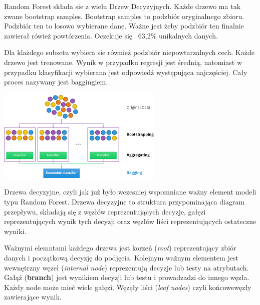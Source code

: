 \documentclass{article}
\begin{document}
Random Forest składa sie z wielu Drzew Decyzyjnych. Każde drzewo ma tak zwane bootstrap samples. Bootstrap samples to podzbiór oryginalnego zbioru. Podzbiór ten to losowo wybierane dane.
Ważne jest żeby podzbiór ten finalnie zawierał rówież powtórzenia. Oczekuje się ~63,2\% unikalnych danych. 

Dla klażdego subsetu wybiera sie również podzbiór niepowtarzalnych cech. Każde drzewo jest trenowane. Wynik w przypadku regresji jest średnią, natomiast w przypadku klasyfikacji wybierana jest odpowiedź występująca najczęściej. Cały proces nazywany jest baggingiem. 

 \begin{center}
    \includegraphics[scale=1]{images/bagging.png}
    \captionsetup{hypcap=false}
    \label{fig:bagging}
\end{center}

Drzewa decyzyjne, czyli jak już było wczesniej wspomniane ważny element modeli typu Random Forest. 
Drzewa decyzyjne to struktura przypominająca diagram przepływu, składają się z węzłów reprezentujących decyzje, gałęzi reprezentujących wynik tych decyzji oraz węzłów liści reprezentujących ostateczne wyniki.

Ważnymi elemntami każdego drzewa jest korzeń (\textit{root}) reprezentujący zbiór danych i początkową decyzję do podjęcia. 
Kolejnym ważnym elementem jest wewnętrzny węzeł (\textit{internal node}) reprezentują decyzje lub testy na atrybutach.
Gałąź (\textbf{branch}) jest wynikiem decyzji lub testu i prowadzadzi do innego węzła. Każdy node może mieć wiele gałęzi. Węzęły liści (\textit{leaf nodes}) czyli końcowewęzły zawierające wynik.
\end{document}
